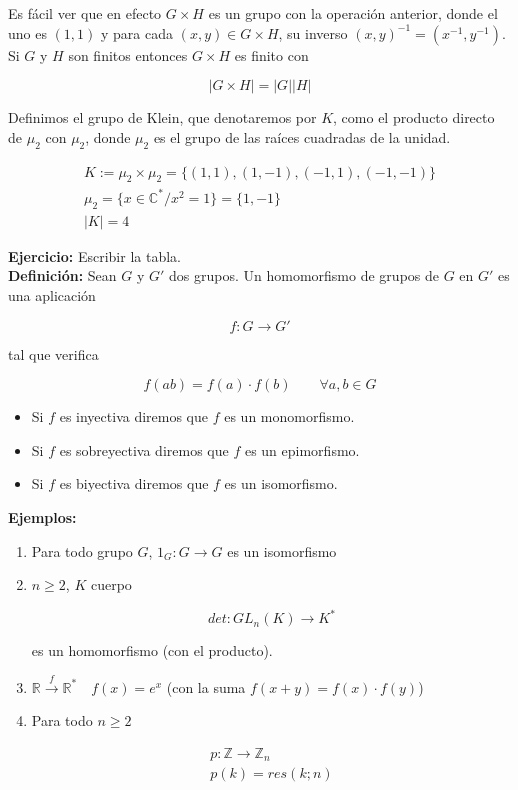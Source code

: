 \documentclass{article}
\begin{document}
Es fácil ver que en efecto $G\times H$ es un grupo con la operación anterior, donde el uno es $(1,1)$ y para cada $(x,y)\in G\times H$, su inverso $(x,y)^{-1}=(x^{-1},y^{-1})$. Si $G$ y $H$ son finitos entonces $G\times H$ es finito con 

\[
|G\times H|=|G||H|
\]

Definimos el grupo de Klein, que denotaremos por $K$, como el producto directo de $\mu_2$ con $\mu_2$, donde $\mu_2$ es el grupo de las raíces cuadradas de la unidad.

\begin{gather*}
K:=\mu_2\times \mu_2=\{(1,1),(1,-1),(-1,1),(-1,-1)\} \\
\mu_2=\{x\in \mathbb{C}^* /x^2=1\}=\{1,-1\} \\
|K|=4
\end{gather*}

\textbf{Ejercicio:} Escribir la tabla. \\

\textbf{Definición:} Sean $G$ y $G'$ dos grupos. Un homomorfismo de grupos de $G$ en $G'$ es una aplicación

\[
f:G\rightarrow G'
\]

tal que verifica

\[
f(ab)=f(a)\cdot f(b) \qquad \forall a,b\in G
\]

\begin{itemize}
\item Si $f$ es inyectiva diremos que $f$ es un monomorfismo.
\item Si $f$ es sobreyectiva diremos que $f$ es un epimorfismo.
\item Si $f$ es biyectiva diremos que $f$ es un isomorfismo.
\end{itemize}

\textbf{Ejemplos:}
\begin{enumerate}[1)]
\item Para todo grupo $G$, $1_G:G\rightarrow G$ es un isomorfismo

\item $n\geq 2$, $K$ cuerpo

\[
det:GL_n(K)\rightarrow K^*
\]

es un homomorfismo (con el producto).

\item $\mathbb{R}\xrightarrow{f}\mathbb{R}^* \quad f(x)=e^x$ (con la suma $f(x+y)=f(x)\cdot f(y)$)

\item Para todo $n\geq 2$

\begin{gather*}
p:\mathbb{Z}\rightarrow \mathbb{Z}_n \\
p(k)=res(k;n)
\end{gather*}
\end{enumerate}
\end{document}
